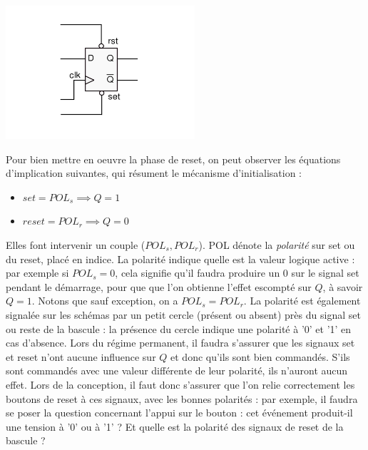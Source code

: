 \begin{center}
  \includegraphics[width=7cm]{./figures/d-ff-full.jpg}
\end{center}

Pour bien mettre en oeuvre la phase de reset, on peut observer les équations d'implication suivantes, qui résument le mécanisme d'initialisation :
\begin{itemize}
  \item $set=POL_s \implies Q=1$
  \item $reset=POL_r \implies Q=0$
\end{itemize}
Elles font intervenir un couple ($POL_s,POL_r$). POL dénote la {\it polarité} sur set ou du reset, placé en indice. La polarité indique quelle est la valeur
logique active : par exemple si $POL_s=0$, cela signifie qu'il faudra produire un $0$ sur le signal set pendant le démarrage, pour que que l'on obtienne
l'effet escompté sur $Q$, à savoir $Q=1$. Notons que sauf exception, on a $POL_s=POL_r$.
La polarité est également signalée sur les schémas par un petit cercle (présent ou absent) près du signal set ou reste de la bascule : la présence du cercle
indique une polarité à '0' et '1' en cas d'absence.
Lors du régime permanent, il faudra s'assurer que les signaux set et reset n'ont aucune influence sur $Q$ et donc
qu'ils sont bien commandés. S'ils sont commandés avec une valeur différente de leur polarité, ils n'auront aucun effet. Lors de la conception, il
faut donc s'assurer que l'on relie correctement les boutons de reset à ces signaux, avec les bonnes polarités : par exemple, il faudra se poser la question
concernant l'appui sur le bouton : cet événement produit-il une tension à '0' ou à '1' ? Et quelle est la polarité des signaux de reset de la bascule ?

